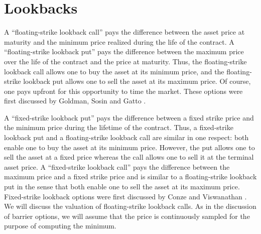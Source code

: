 
\section{Lookbacks}\label{s_lookbacks}

   A ``floating-strike lookback call'' pays the difference between the asset price at maturity and the minimum price realized during the life of the contract.  A ``floating-strike lookback put'' pays the difference between the maximum price over the life of the contract and the price at maturity.  Thus, the floating-strike lookback call allows one to buy the asset at its minimum price, and the floating-strike lookback put allows one to sell the asset at its maximum price.   Of course, one pays upfront for this opportunity to time the market.  These options were first discussed by Goldman, Sosin and Gatto \cite{GSG}.

A ``fixed-strike lookback put'' pays the difference between a fixed strike price and the minimum price during the lifetime of the contract.   Thus, a fixed-strike lookback put and a floating-strike lookback call are similar in one respect:  both enable one to buy the asset at its minimum price.  However, the put allows one to sell the asset at a fixed price whereas the call allows one to sell it at the terminal asset price.  A ``fixed-strike lookback call'' pays the difference between the maximum price and a fixed strike price and is similar to a floating-strike lookback put in the sense that both enable one to sell the asset at its maximum price.  Fixed-strike lookback options were first discussed by Conze and Viswanathan \cite{CV}.
We will discuss the valuation of floating-strike lookback calls. As in the discussion of barrier options, we will assume that the price is continuously sampled for the purpose of computing the minimum.

